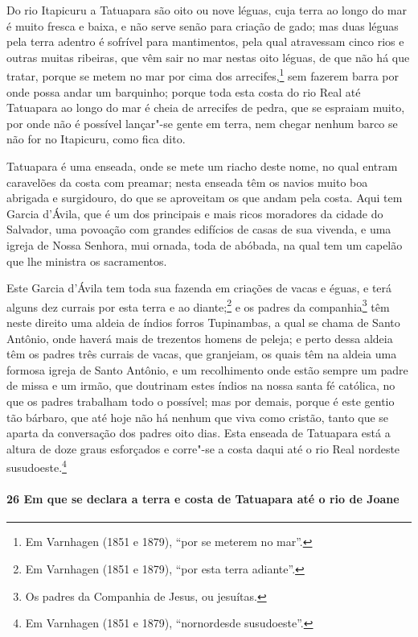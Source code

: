 Do rio Itapicuru a Tatuapara são oito ou nove léguas, cuja terra ao longo do mar é muito
fresca e baixa, e não serve senão para criação de gado; mas duas léguas pela terra adentro
é sofrível para mantimentos, pela qual atravessam cinco rios e outras muitas ribeiras, que
vêm sair no mar nestas oito léguas, de que não há que tratar, porque se metem no mar por
cima dos arrecifes,\footnote{ Em Varnhagen (1851 e 1879), ``por se meterem no mar''.} sem
fazerem barra por onde possa andar um barquinho; porque toda esta costa do rio Real até
Tatuapara ao longo do mar é cheia de arrecifes de pedra, que se espraiam muito, por onde
não é possível lançar"-se gente em terra, nem chegar nenhum barco se não for no Itapicuru,
como fica dito.

Tatuapara é uma enseada, onde se mete um riacho deste nome, no qual entram caravelões da
costa com preamar; nesta enseada têm os navios muito boa abrigada e surgidouro, do que se
aproveitam os que andam pela costa. Aqui tem Garcia d'Ávila, que é um dos principais e
mais ricos moradores da cidade do Salvador, uma povoação com grandes edifícios de casas de
sua vivenda, e uma igreja de Nossa Senhora, mui ornada, toda de abóbada, na qual tem um
capelão que lhe ministra os sacramentos.

Este Garcia d'Ávila tem toda sua fazenda em criações de vacas e éguas, e terá alguns dez
currais por esta terra e ao diante;\footnote{ Em Varnhagen (1851 e 1879), ``por esta terra
adiante''.} e os padres da companhia\footnote{ Os padres da Companhia de Jesus, ou
jesuítas.} têm neste direito uma aldeia de índios forros Tupinambas, a qual se chama de
Santo Antônio, onde haverá mais de trezentos homens de peleja; e perto dessa aldeia têm os
padres três currais de vacas, que granjeiam, os quais têm na aldeia uma formosa igreja de
Santo Antônio, e um recolhimento onde estão sempre um padre de missa e um irmão, que
doutrinam estes índios na nossa santa fé católica, no que os padres trabalham todo o
possível; mas por demais, porque é este gentio tão bárbaro, que até hoje não há nenhum que
viva como cristão, tanto que se aparta da conversação dos padres oito dias. Esta enseada
de Tatuapara está a altura de doze graus esforçados e corre"-se a costa daqui até o rio
Real nordeste susudoeste.\footnote{ Em Varnhagen (1851 e 1879), ``nornordesde
susudoeste''.}

\paragraph{26 Em que se declara a terra e costa de Tatuapara até o rio de Joane}

